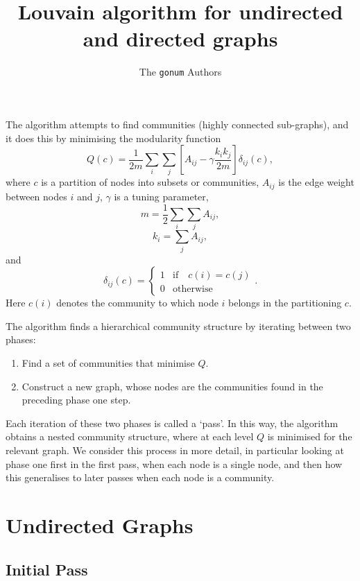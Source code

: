 \documentclass{article}
\title{Louvain algorithm for undirected and directed graphs}
\author{The {\tt gonum} Authors}
\begin{document}
\maketitle

The algorithm attempts to find communities (highly connected sub-graphs),
and it does this by minimising the modularity function
\begin{equation}
	Q(c) = \frac{1}{2m}\sum_i\sum_j\left[ A_{ij} - \gamma \frac{k_ik_j}{2m} \right] \delta_{ij}(c),
\end{equation}
where $c$ is a partition of nodes into subsets or communities,
$A_{ij}$ is the edge weight between nodes $i$ and $j$, 
$\gamma$ is a tuning parameter,
\begin{equation}
m = \frac{1}{2}\sum_i\sum_jA_{ij},
\end{equation}
\begin{equation}
k_i = \sum_j{A_{ij}},
\end{equation}
and 
\begin{equation}
	\delta_{ij}(c) = \left \{ \begin{array}{ll}
	1 & \text{if} \quad  c(i) = c(j) \\
	0 & \text{otherwise} \end{array} \right ..
\end{equation}
Here $c(i)$ denotes the community to which node $i$ belongs 
in the partitioning $c$.

The algorithm finds a hierarchical community structure by iterating 
between two phases:
\begin{enumerate}
	\item Find a set of communities that minimise $Q$.
	\item Construct a new graph, whose nodes are the communities 
	found in the preceding phase one step.
\end{enumerate}
Each iteration of these two phases is called a `pass'.
In this way, the algorithm obtains a nested community structure, 
where at each level $Q$ is minimised for the relevant graph.
We consider this process in more detail, in particular looking 
at phase one first in the first pass, when each node is a single
node, and then how this generalises to later passes when each node 
is a community.

\section{Undirected Graphs}

\subsection{Initial Pass}
\label{sec:initialPass}
\end{document}
